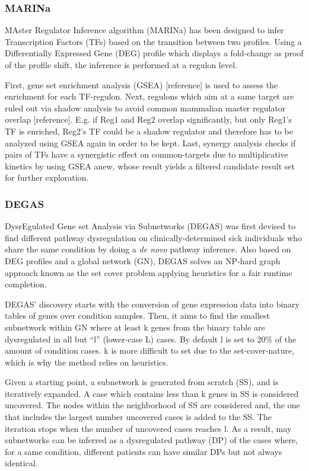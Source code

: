 \subsubsection{MARINa}
MAster Regulator Inference algorithm (MARINa) \cite{Lefebvre2010ACenters} has been designed to infer Transcription Factors (TFs) based on the transition between two profiles. Using a Differentially Expressed Gene (DEG) profile which displays a fold-change as proof of the profile shift, the inference is performed at a regulon level.


First, gene set enrichment analysis (GSEA) [reference] is used to assess the enrichment for each TF-regulon. Next, regulons which aim at a same target are ruled out via shadow analysis to avoid common mammalian master regulator overlap [reference]. E.g. if  Reg1 and Reg2 overlap significantly, but only Reg1's TF is enriched, Reg2’s TF could be a shadow regulator and therefore has to be analyzed using GSEA again in order to be kept.
Last, synergy analysis checks if pairs of TFs have a synergistic effect on common-targets due to multiplicative kinetics by using GSEA anew, whose result yields a filtered candidate result set for further exploration.


\subsubsection{DEGAS}
DysrEgulated Gene set Analysis via Subnetworks (DEGAS) \cite{Ulitsky2010DEGAS:Diseases} was first devised to find different pathway dysregulation on clinically-determined sick individuals who share the same condition by doing a \textit{de novo} pathway inference. Also based on DEG profiles and a global network (GN), DEGAS solves an NP-hard graph approach known as the set cover problem applying heuristics for a fair runtime completion.

DEGAS’ discovery starts with the conversion of gene expression data into binary tables of genes over condition samples. Then, it aims to find the smallest subnetwork within GN where at least k genes from the binary table are dysregulated in all but “l” (lower-case L) cases. By default l is set to 20\% of the amount of condition cases. k is more difficult to set due to the set-cover-nature, which is why the method relies on heuristics. 


Given a starting point, a subnetwork is generated from scratch (SS), and is iteratively expanded. A case which contains less than k genes in SS is considered uncovered. The nodes within the neighborhood of SS are considered and, the one that includes the largest number uncovered cases is added to the SS. The iteration stops when the number of uncovered cases reaches l. As a result, may subnetworks can be inferred as a dysregulated pathway (DP) of the cases where, for a same condition, different patients can have similar DPs but not always identical.

